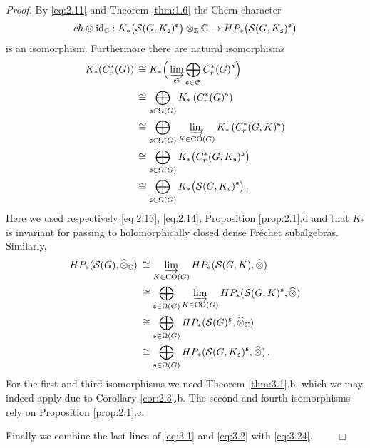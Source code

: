 \emph{Proof.}
By \eqref{eq:2.11} and Theorem \ref{thm:1.6} the Chern character
\begin{equation}\label{eq:3.24}
ch \otimes \mathrm{id}_{\mathbb C} : K_* \big( \mathcal S (G,K_{\mathfrak s} )^{\mathfrak s} \big) \otimes_{\mathbb Z} \mathbb C
\to HP_* \big( \mathcal S (G,K_{\mathfrak s} )^{\mathfrak s} \big)
\end{equation}
is an isomorphism. Furthermore there are natural isomorphisms
\begin{equation}\label{eq:3.1}
\begin{aligned}
K_* (C_r^* (G)) \, &\cong K_* \Big( \varinjlim_{\mathfrak S} 
\bigoplus_{\mathfrak s \in \mathfrak S} C_r^* (G)^{\mathfrak s} \Big) \\
& \cong \bigoplus_{\mathfrak s \in \Omega (G)} K_* \left( C_r^* (G)^{\mathfrak s} \right) \\
& \cong \bigoplus_{\mathfrak s \in \Omega (G)} \varinjlim_{K \in \mathrm{CO} (G)} 
K_* \left( C_r^* (G,K)^{\mathfrak s} \right) \\
& \cong \bigoplus_{\mathfrak s \in \Omega (G)} 
K_* \big( C_r^* (G,K_{\mathfrak s} )^{\mathfrak s} \big)\\
&\cong \bigoplus_{\mathfrak s \in \Omega (G)} 
K_* \big( \mathcal S (G,K_{\mathfrak s} )^{\mathfrak s} \big) \,.
\end{aligned}
\end{equation}
Here we used respectively \eqref{eq:2.13}, \eqref{eq:2.14},
Proposition \ref{prop:2.1}.d and that $K_*$ is invariant for passing 
to holomorphically closed dense Fr\'echet subalgebras. Similarly,
\begin{equation}\label{eq:3.2}
\begin{aligned}
HP_* (\mathcal S (G), \widehat{\otimes}_{\mathbb C} ) \: & \cong 
\varinjlim_{K \in \mathrm{CO} (G)} HP_* (\mathcal S (G,K), \widehat{\otimes} )\\
&\cong \bigoplus_{\mathfrak s \in \Omega (G)} \varinjlim_{K \in \mathrm{CO} (G)}
HP_* (\mathcal S (G,K)^{\mathfrak s}, \widehat{\otimes} )\\
& \cong \bigoplus_{\mathfrak s \in \Omega (G)} 
HP_* (\mathcal S (G)^{\mathfrak s}, \widehat{\otimes}_{\mathbb C} )\\
&\cong \bigoplus_{\mathfrak s \in \Omega (G)} 
HP_* (\mathcal S (G, K_{\mathfrak s})^{\mathfrak s}, \widehat{\otimes} ) \,.
\end{aligned}
\end{equation}
For the first and third isomorphisms we need Theorem \ref{thm:3.1}.b,
which we may indeed apply due to Corollary \ref{cor:2.3}.b. The second and
fourth isomorphisms rely on Proposition \ref{prop:2.1}.c. 

Finally we combine the last lines of  \eqref{eq:3.1} and \eqref{eq:3.2} with \eqref{eq:3.24}.
$\qquad \Box$ \\[2mm]

